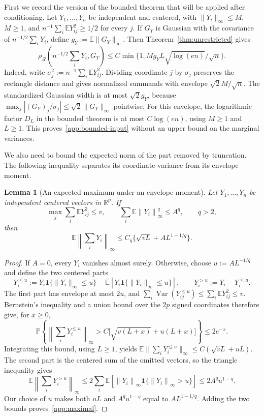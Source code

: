 \documentclass[11pt,letterpaper]{article}
\newtheorem{lemma}{Lemma}
\theoremstyle{remark}
\newcommand{\E}{\mathbb E}
\newcommand{\Pp}{\mathbb P}
\newcommand{\R}{\mathbb R}
\newcommand{\Var}{\operatorname{Var}}
\newcommand{\norm}[1]{\left\lVert#1\right\rVert}
\newcommand{\rh}{\rho_{\mathcal R}}
\newcommand{\ind}{\mathbf 1}
\begin{document}
First we record the version of the bounded theorem that will be
applied after conditioning. Let $Y_1,\ldots,Y_n$ be independent and
centered, with $\|Y_i\|_\infty\le M$, $M\ge1$, and
$n^{-1}\sum_i\E Y_{ij}^2\ge1/2$ for every $j$. If $G_Y$ is
Gaussian with the covariance of $n^{-1/2}\sum_iY_i$, define
$g_Y:=\E\|G_Y\|_\infty$. Then Theorem~\ref{thm:unrestricted} gives
\begin{equation}
 \rh\left(n^{-1/2}\sum_iY_i,G_Y\right)
 \le C\min\{1,Mg_YL\sqrt{\log(en)}/\sqrt n\}.
 \label{app:bounded-input}
\end{equation}
Indeed, write $\sigma_j^2:=n^{-1}\sum_i\E Y_{ij}^2$. Dividing
coordinate $j$ by $\sigma_j$ preserves the rectangle distance and
gives normalized summands with envelope $\sqrt2M/\sqrt n$.
The standardized Gaussian width is at most $\sqrt2g_Y$, because
$\max_j|(G_Y)_j/\sigma_j|\le\sqrt2\|G_Y\|_\infty$ pointwise.
For this envelope, the logarithmic factor $D_L$ in the bounded
theorem is at most $C\log(en)$, using $M\ge1$ and $L\ge1$.
This proves~\eqref{app:bounded-input} without an upper bound on
the marginal variances.

We also need to bound the expected norm of the part removed by
truncation. The following inequality separates its coordinate
variance from its envelope moment.

\begin{lemma}[An expected maximum under an envelope moment]\label{lem:maximum}
Let $Y_1,\ldots,Y_n$ be independent centered vectors in $\R^p$.
If
\[
 \max_j\sum_i\E Y_{ij}^2\le v,\qquad
 \sum_i\E\norm{Y_i}_\infty^q\le A^q,\qquad q>2,
\]
then
\begin{equation}
 \E\norm{\sum_iY_i}_\infty
 \le C_q\{\sqrt{vL}+AL^{1-1/q}\}.
 \label{app:maximal}
\end{equation}
\end{lemma}
\begin{proof}
If $A=0$, every $Y_i$ vanishes almost surely. Otherwise, choose
$u:=AL^{-1/q}$ and define the two centered parts
\[
 Y_i^{\le u}:=Y_i\ind\{\|Y_i\|_\infty\le u\}
       -\E[Y_i\ind\{\|Y_i\|_\infty\le u\}],
 \qquad Y_i^{>u}:=Y_i-Y_i^{\le u}.
\]
The first part has envelope at most $2u$, and
$\sum_i\Var(Y_{ij}^{\le u})\le\sum_i\E Y_{ij}^2\le v$.
Bernstein's inequality and a union bound over the $2p$ signed
coordinates therefore give, for $x\ge0$,
\[
 \Pp\left\{\left\|\sum_iY_i^{\le u}\right\|_\infty
       >C\bigl[\sqrt{v(L+x)}+u(L+x)\bigr]\right\}
 \le2e^{-x}.
\]
Integrating this bound, using $L\ge1$, yields
$\E\|\sum_iY_i^{\le u}\|_\infty\le C(\sqrt{vL}+uL)$.
The second part is the centered sum of the omitted vectors, so
the triangle inequality gives
\[
 \E\left\|\sum_iY_i^{>u}\right\|_\infty
 \le2\sum_i\E[\norm{Y_i}_\infty\ind\{\norm{Y_i}_\infty>u\}]
 \le2A^qu^{1-q}.
\]
Our choice of $u$ makes both $uL$ and $A^qu^{1-q}$ equal to
$AL^{1-1/q}$. Adding the two bounds proves~\eqref{app:maximal}.
\end{proof}
\end{document}
